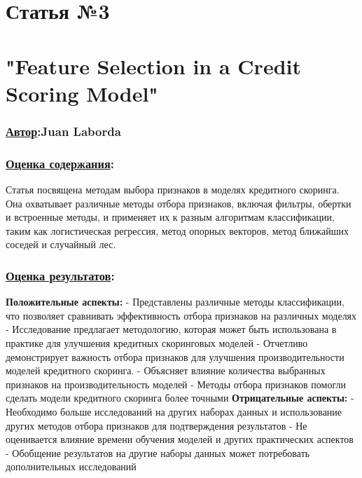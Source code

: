 \documentclass[a4paper,14pt]{article}
\begin{document}
\newpage

\section*{Статья №3}
\section*{"Feature Selection in a Credit Scoring Model"}
\subsubsection*{\underline {Автор}:Juan Laborda}

\subsubsection*{\underline{Оценка содержания}:}
Статья посвящена методам выбора признаков в моделях кредитного скоринга. Она охватывает различные методы отбора признаков, включая фильтры, обертки и встроенные методы, и применяет их к разным алгоритмам классификации, таким как логистическая регрессия, метод опорных векторов, метод ближайших соседей и случайный лес. 
\subsubsection*{\underline{Оценка результатов}:}
\textbf{Положительные аспекты:} \newline
- Представлены различные методы классификации, что позволяет сравнивать эффективность отбора признаков на различных моделях \newline
- Исследование предлагает методологию, которая может быть использована в практике для улучшения кредитных скоринговых моделей \newline
- Отчетливо демонстрирует важность отбора признаков для улучшения производительности моделей кредитного скоринга. \newline
- Объясняет влияние количества выбранных признаков на производительность моделей \newline
- Методы отбора признаков помогли сделать модели кредитного скоринга более точными \vspace{10pt} \newline
\textbf{Отрицательные аспекты:} \newline
- Необходимо больше исследований на других наборах данных и использование других методов отбора признаков для подтверждения результатов \newline
- Не оценивается влияние времени обучения моделей и других практических аспектов \newline
- Обобщение результатов на другие наборы данных может потребовать дополнительных исследований
\end{document}
